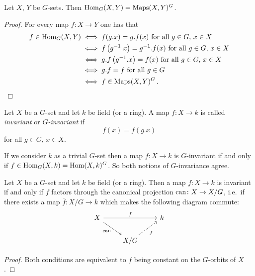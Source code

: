 \begin{lemma}
  Let $X$, $Y$ be $G$-sets.
  Then $\operatorname{Hom}_G(X,Y) = \operatorname{Maps}(X,Y)^G$.
\end{lemma}
\begin{proof}
  For every map $f \colon X \to Y$ one has that
  \begin{align*}
          f \in \operatorname{Hom}_G(X,Y)
    &\iff \text{$f(g.x) = g.f(x)$ for all $g \in G$, $x \in X$} \\
    &\iff \text{$f\left( g^{-1}.x \right) = g^{-1}.f(x)$ for all $g \in G$, $x \in X $} \\
    &\iff \text{$g.f\left( g^{-1}.x \right) = f(x)$ for all $g \in G$, $x \in X$} \\
    &\iff \text{$g.f = f$ for all $g \in G$}  \\
    &\iff f \in \operatorname{Maps}(X,Y)^G \,.
    \qedhere
  \end{align*}
\end{proof}


\begin{definition}
  Let $X$ be a $G$-set and let $k$ be field (or a ring).
  A map $f \colon X \to k$ is called \emph{invariant} or \emph{$G$-invariant} if
  \[
      f(x)
    = f\left( g.x \right)
  \]
  for all $g \in G$, $x \in X$.
\end{definition}


\begin{fluff}
  If we consider $k$ as a trivial $G$-set then a map $f \colon X \to k$ is $G$-invariant if and only if $f \in \operatorname{Hom}_G(X,k) = \operatorname{Hom}(X,k)^G$.
  So both notions of $G$-invariance agree.
\end{fluff}


\begin{lemma}
  Let $X$ be a $G$-set and let $k$ be field (or a ring).
  Then a map $f \colon X \to k$ is invariant if and only if $f$ factors through the canonical projection $\operatorname{can} \colon X \to X/G$, i.e.\ if there exists a map $\bar{f} \colon X/G \to k$ which makes the following diagram commute:
  \[
    \begin{tikzcd}
        X
        \arrow{rr}{f}
        \arrow[swap]{rd}{\can}
      & {}
      & k
      \\
        {}
      & X/G
        \arrow[swap, dashed]{ru}{\bar{f}}
      & {}
    \end{tikzcd}
  \]
\end{lemma}
\begin{proof}
  Both conditions are equivalent to $f$ being constant on the $G$-orbits of $X$.
\end{proof}


